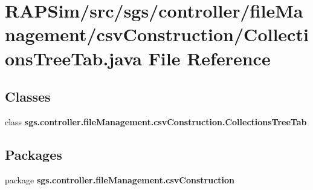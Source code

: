 \section{R\-A\-P\-Sim/src/sgs/controller/file\-Management/csv\-Construction/\-Collections\-Tree\-Tab.java File Reference}
\label{_collections_tree_tab_8java}
\subsection*{Classes}
\begin{DoxyCompactItemize}
\item 
class {\bf sgs.\-controller.\-file\-Management.\-csv\-Construction.\-Collections\-Tree\-Tab}
\end{DoxyCompactItemize}
\subsection*{Packages}
\begin{DoxyCompactItemize}
\item 
package {\bf sgs.\-controller.\-file\-Management.\-csv\-Construction}
\end{DoxyCompactItemize}
